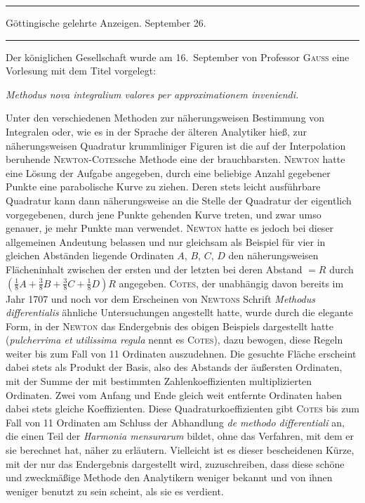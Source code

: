 \par{}\begin{center}
\rule{0.6\linewidth}{0.4pt}\par\medskip
Göttingische gelehrte Anzeigen. September 26.\par\medskip
\rule{0.6\linewidth}{0.4pt}
\end{center}

Der königlichen Gesellschaft wurde am 16.\ September von Professor \textsc{Gauss} eine Vorlesung mit dem Titel vorgelegt:

\begin{center}
\textit{Methodus nova integralium valores per approximationem inveniendi.}
\end{center}

Unter den verschiedenen Methoden zur näherungsweisen Bestimmung von Integralen oder, wie es in der Sprache der älteren Analytiker hieß, zur näherungsweisen Quadratur krummliniger Figuren ist die auf der Interpolation beruhende \textsc{Newton}-\textsc{Cotes}sche Methode eine der brauchbarsten. \textsc{Newton} hatte eine Lösung der Aufgabe angegeben, durch eine beliebige Anzahl gegebener Punkte eine parabolische Kurve zu ziehen. Deren stets leicht ausführbare Quadratur kann dann näherungsweise an die Stelle der Quadratur der eigentlich vorgegebenen, durch jene Punkte gehenden Kurve treten, und zwar umso genauer, je mehr Punkte man verwendet. \textsc{Newton} hatte es jedoch bei dieser allgemeinen Andeutung belassen und nur gleichsam als Beispiel für vier in gleichen Abständen liegende Ordinaten $A$, $B$, $C$, $D$ den näherungsweisen Flächeninhalt zwischen der ersten und der letzten bei deren Abstand $=R$ durch $(\frac{1}{8}A+\frac{3}{8}B+\frac{3}{8}C+\frac{1}{8}D)R$ angegeben. \textsc{Cotes}, der unabhängig davon bereits im Jahr 1707 und noch vor dem Erscheinen von \textsc{Newtons} Schrift \textit{Methodus differentialis} ähnliche Untersuchungen angestellt hatte, wurde durch die elegante Form, in der \textsc{Newton} das Endergebnis des obigen Beispiels dargestellt hatte (\textit{pulcherrima et}
\textit{utilissima regula} nennt es \textsc{Cotes}), dazu bewogen, diese Regeln weiter bis zum Fall von 11 Ordinaten auszudehnen. Die gesuchte Fläche erscheint dabei stets als Produkt der Basis, also des Abstands der äußersten Ordinaten, mit der Summe der mit bestimmten Zahlenkoeffizienten multiplizierten Ordinaten. Zwei vom Anfang und Ende gleich weit entfernte Ordinaten haben dabei stets gleiche Koeffizienten. Diese Quadraturkoeffizienten gibt \textsc{Cotes} bis zum Fall von 11 Ordinaten am Schluss der Abhandlung \textit{de methodo differentiali} an, die einen Teil der \textit{Harmonia mensurarum} bildet, ohne das Verfahren, mit dem er sie berechnet hat, näher zu erläutern. Vielleicht ist es dieser bescheidenen Kürze, mit der nur das Endergebnis dargestellt wird, zuzuschreiben, dass diese schöne und zweckmäßige Methode den Analytikern weniger bekannt und von ihnen weniger benutzt zu sein scheint, als sie es verdient.

